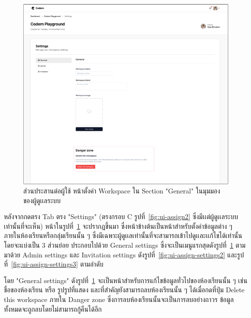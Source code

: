 \documentclass[12pt,one side,openright,a4paper]{cpe-thesis-th}
\newcommand{\thaijustify}[1]{%
  \par\hspace{30pt}\justifying
  #1
}
\begin{document}
\hypertarget{ui-assign-settings1}{
  \begin{figure}[H]
    \centering
    \includegraphics[width=15cm]{figure/ui/ui-assign-settings1.png}
    \caption[ส่วนประสานต่อผู้ใช้ หน้าตั้งค่า Workspace ใน Section "General" ในมุมมองของผู้ดูเเลระบบ]{ส่วนประสานต่อผู้ใช้ หน้าตั้งค่า Workspace ใน Section "General" ในมุมมองของผู้ดูเเลระบบ}
    \label{fig:ui-assign-settings1}
  \end{figure}
}
\thaijustify{
  หลังจากกดตรง Tab ตรง "Settings" (ตรงกรอบ C รูปที่~\ref{fig:ui-assign2} ซึ่งมีเเต่ผู้ดูเเลระบบเท่านั้นที่จะเห็น) หน้าในรูปที่~\ref{fig:ui-assign-settings1} จะปรากฎขึ้นมา ซึ่งหน้าข้างต้นเป็นหน้าสำหรับตั้งค่าข้อมูลต่าง ๆ ภายในห้องเรียนหรือกลุ่มเรียนนั้น ๆ ซึ่งมีเฉพาะผู้ดูเเลเท่านั้นที่จะสามารถเข้าไปดูเเละเเก้ไขได้เท่านั้น โดยจะแบ่งเป็น 3 ส่วนย่อย ประกอบไปด้วย General settings ซึ่งจะเป็นเมนูแรกสุดดังรูปที่~\ref{fig:ui-assign-settings1} ตามมาด้วย Admin settings และ Invitation settings ดังรูปที่~\ref{fig:ui-assign-settings2} และรูปที่~\ref{fig:ui-assign-settings3} ตามลำดับ
}
\thaijustify{
  โดย "General settings" ดังรูปที่~\ref{fig:ui-assign-settings1} จะเป็นหน้าสำหรับการแก้ไขข้อมูลทั่วไปของห้องเรียนนั้น ๆ เช่น ชื่อของห้องเรียน หรือ รูปรูปที่แสดง และที่สำคัญยังสามารถลบห้องเรียนนั้น ๆ ได้เมื่อกดที่ปุ่ม Delete this workspace ภายใน Danger zone ซึ่งการลบห้องเรียนนั้นจะเป็นการลบอย่างถาวร ข้อมูลทั้งหมดจะถูกลบโดยไม่สามารถกู้คืนได้อีก
}
\end{document}
